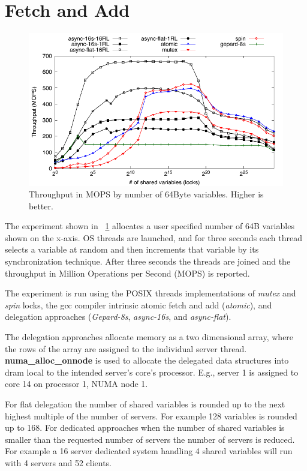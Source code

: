 \documentclass{uicthesi}
\begin{document}
\section{Fetch and Add}
\begin{figure}[ht!]
\centering
\includegraphics[width=0.9\columnwidth]{FIG/fetch_and_add_thput.pdf}
\caption{Throughput in MOPS by number of 64Byte variables. Higher is better. }
\label{fig:fetch_and_add_thput}
\end{figure}

The experiment shown in ~\ref{fig:fetch_and_add_thput} allocates a user specified number of 64B variables shown on the x-axis. OS threads are launched, and for three seconds each thread selects a variable at random and then increments that variable by its synchronization technique. After three seconds the threads are joined and the throughput in Million Operations per Second (MOPS) is reported. 

The experiment is run using the POSIX threads implementations of \textit{mutex} and \textit{spin} locks, the gcc compiler intrinsic atomic fetch and add (\textit{atomic}), and delegation approaches (\textit{Gepard-8s}, \textit{async-16s}, and \textit{async-flat}). 

The delegation approaches allocate memory as a two dimensional array, where the rows of the array are assigned to the individual server thread. \textbf{numa\_alloc\_onnode} is used to allocate the delegated data structures into dram local to the intended server's core's processor. E.g., server 1 is assigned to core 14 on processor 1, NUMA node 1. 

For flat delegation the number of shared variables is rounded up to the next highest multiple of the number of servers. For example 128 variables is rounded up to 168. For dedicated approaches when the number of shared variables is smaller than the requested number of servers the number of servers is reduced. For example a 16 server dedicated system handling 4 shared variables will run with 4 servers and 52 clients. 
\end{document}

